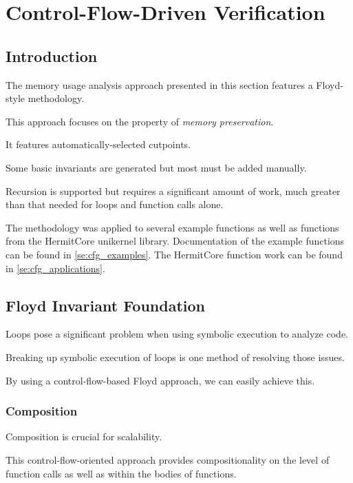 \chapter{Control-Flow-Driven Verification}

\section{Introduction}\label{se:cfg_intro}
The memory usage analysis approach presented in this section features a Floyd-style methodology.

This approach focuses on the property of \emph{memory preservation}.

It features automatically-selected cutpoints.

Some basic invariants are generated but most must be added manually.

Recursion is supported but requires a significant amount of work,
much greater than that needed for loops and function calls alone.

The methodology was applied to several example functions
as well as functions from the HermitCore unikernel library.
Documentation of the example functions can be found in \cref{se:cfg_examples}.
The HermitCore function work can be found in \cref{se:cfg_applications}.

\section{Floyd Invariant Foundation}\label{se:cfg_invariant}

Loops pose a significant problem when using symbolic execution to analyze code.

Breaking up symbolic execution of loops is one method of resolving those issues.

By using a control-flow-based Floyd approach, we can easily achieve this.

\subsection{Composition}
Composition is crucial for scalability.

This control-flow-oriented approach provides compositionality on the level of function calls
as well as within the bodies of functions.

